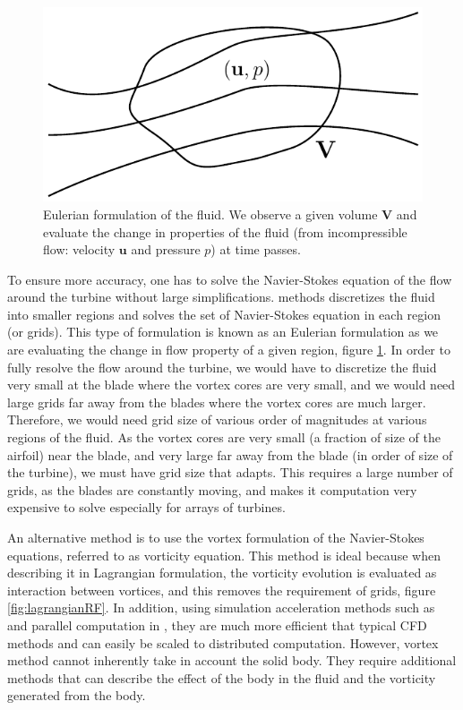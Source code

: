 	\begin{figure}[!t]
		\centering
		\includegraphics[width=0.4\linewidth]{figures/introduction/eulerianRF.pdf}
		\caption{Eulerian formulation of the fluid. We observe a given volume $\mathbf{V}$ and evaluate the change in properties of the fluid (from incompressible flow: velocity $\mathbf{u}$ and pressure $p$) at time passes.}
		\label{fig:eulerianRF}
	\end{figure}

To ensure more accuracy, one has to solve the Navier-Stokes equation of the flow around the turbine without large simplifications.  methods discretizes the fluid into smaller regions and solves the set of Navier-Stokes equation in each region (or grids). This type of formulation is known as an Eulerian formulation as we are evaluating the change in flow property of a given region, figure \ref{fig:eulerianRF}. In order to fully resolve the flow around the turbine, we would have to discretize the fluid very small at the blade where the vortex cores are very small, and we would need large grids far away from the blades where the vortex cores are much larger. Therefore, we would need grid size of various order of magnitudes at various regions of the fluid. As the vortex cores are very small (a fraction of size of the airfoil) near the blade, and very large far away from the blade (in order of size of the turbine), we must have grid size that adapts. This requires a large number of grids, as the blades are constantly  moving, and makes it computation very expensive to solve especially for arrays of turbines.

An alternative method is to use the vortex formulation of the Navier-Stokes equations, referred to as vorticity equation. This method is ideal because when describing it in Lagrangian formulation, the vorticity evolution is evaluated as interaction between vortices, and this removes the requirement of grids, figure \ref{fig:lagrangianRF}. In addition, using simulation acceleration methods such as  and parallel computation in , they are much more efficient that typical CFD methods and can easily be scaled to distributed computation. However, vortex method cannot inherently take in account the solid body. They require additional methods that can describe the effect of the body in the fluid and the vorticity generated from the body.

